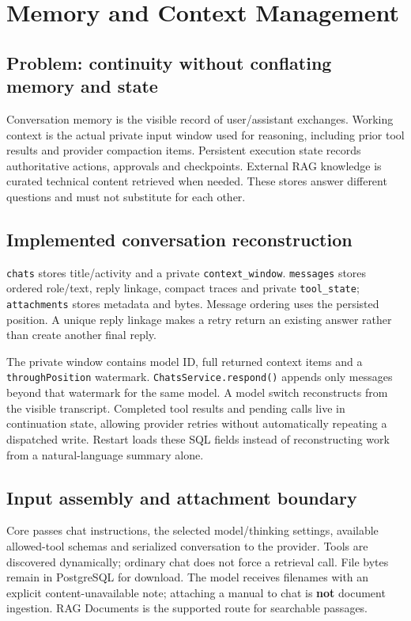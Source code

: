 \chapter{Memory and Context Management}
\section{Problem: continuity without conflating memory and state}
Conversation memory is the visible record of user/assistant exchanges. Working context is the actual private input window used for reasoning, including prior tool results and provider compaction items. Persistent execution state records authoritative actions, approvals and checkpoints. External RAG knowledge is curated technical content retrieved when needed. These stores answer different questions and must not substitute for each other.
\section{Implemented conversation reconstruction}
\texttt{chats} stores title/activity and a private \texttt{context\_window}. \texttt{messages} stores ordered role/text, reply linkage, compact traces and private \texttt{tool\_state}; \texttt{attachments} stores metadata and bytes. Message ordering uses the persisted position. A unique reply linkage makes a retry return an existing answer rather than create another final reply.

The private window contains model ID, full returned context items and a \texttt{throughPosition} watermark. \texttt{ChatsService.respond()} appends only messages beyond that watermark for the same model. A model switch reconstructs from the visible transcript. Completed tool results and pending calls live in continuation state, allowing provider retries without automatically repeating a dispatched write. Restart loads these SQL fields instead of reconstructing work from a natural-language summary alone.
\section{Input assembly and attachment boundary}
Core passes chat instructions, the selected model/thinking settings, available allowed-tool schemas and serialized conversation to the provider. Tools are discovered dynamically; ordinary chat does not force a retrieval call. File bytes remain in PostgreSQL for download. The model receives filenames with an explicit content-unavailable note; attaching a manual to chat is \textbf{not} document ingestion. RAG Documents is the supported route for searchable passages.
